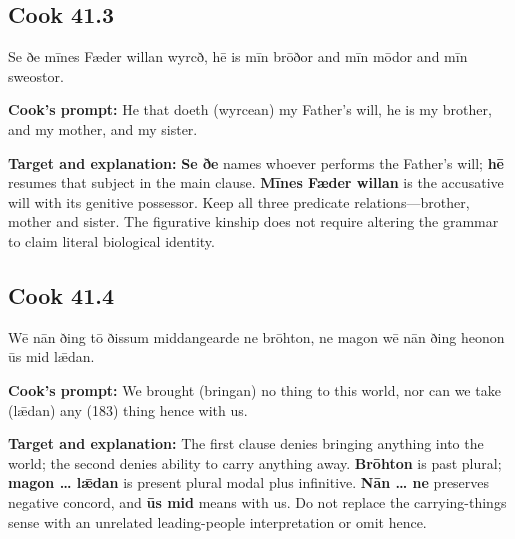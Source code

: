 \par\begin{minipage}{\linewidth}\raggedright
\subsection*{Cook 41.3}

Se ðe mīnes Fæder willan wyrcð, hē is mīn brōðor and mīn mōdor and mīn sweostor.

\textbf{Cook's prompt:} He that doeth (wyrcean) my Father’s will, he is my brother, and my mother, and my sister.

\textbf{Target and explanation:} \textbf{Se ðe} names whoever performs the Father's will; \textbf{hē} resumes that subject in the main clause. \textbf{Mīnes Fæder willan} is the accusative will with its genitive possessor. Keep all three predicate relations—brother, mother and sister. The figurative kinship does not require altering the grammar to claim literal biological identity.

\end{minipage}\par\addvspace{4pt}

\par\begin{minipage}{\linewidth}\raggedright
\subsection*{Cook 41.4}

Wē nān ðing tō ðissum middangearde ne brōhton, ne magon wē nān ðing heonon ūs mid lǣdan.

\textbf{Cook's prompt:} We brought (bringan) no thing to this world, nor can we take (lǣdan) any (183) thing hence with us.

\textbf{Target and explanation:} The first clause denies bringing anything into the world; the second denies ability to carry anything away. \textbf{Brōhton} is past plural; \textbf{magon … lǣdan} is present plural modal plus infinitive. \textbf{Nān … ne} preserves negative concord, and \textbf{ūs mid} means with us. Do not replace the carrying-things sense with an unrelated leading-people interpretation or omit hence.

\end{minipage}\par\addvspace{4pt}

